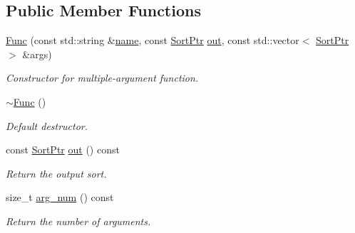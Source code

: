 \subsection*{Public Member Functions}
\begin{DoxyCompactItemize}
\item 
\mbox{\label{classilang_1_1_func_a68120449566b97422d856a045e376d5c}} 
\mbox{\hyperlink{classilang_1_1_func_a68120449566b97422d856a045e376d5c}{Func}} (const std\+::string \&\mbox{\hyperlink{classilang_1_1_object_acf20b072e69f572910d7d80c93af0b38}{name}}, const \mbox{\hyperlink{namespaceilang_ae01073336878d60a231f4fe96d45ab55}{Sort\+Ptr}} \mbox{\hyperlink{classilang_1_1_func_a58414a3455af0484ccfcce8401b02d37}{out}}, const std\+::vector$<$ \mbox{\hyperlink{namespaceilang_ae01073336878d60a231f4fe96d45ab55}{Sort\+Ptr}} $>$ \&args)
\begin{DoxyCompactList}\small\item\em Constructor for multiple-\/argument function. \end{DoxyCompactList}\item 
\mbox{\label{classilang_1_1_func_a069c00d01e70a84fb217191ab5cd45dc}} 
\mbox{\hyperlink{classilang_1_1_func_a069c00d01e70a84fb217191ab5cd45dc}{$\sim$\+Func}} ()
\begin{DoxyCompactList}\small\item\em Default destructor. \end{DoxyCompactList}\item 
\mbox{\label{classilang_1_1_func_a58414a3455af0484ccfcce8401b02d37}} 
const \mbox{\hyperlink{namespaceilang_ae01073336878d60a231f4fe96d45ab55}{Sort\+Ptr}} \mbox{\hyperlink{classilang_1_1_func_a58414a3455af0484ccfcce8401b02d37}{out}} () const
\begin{DoxyCompactList}\small\item\em Return the output sort. \end{DoxyCompactList}\item 
\mbox{\label{classilang_1_1_func_aa4ac51e100f5fd9380ce9d43fe2a3092}} 
size\+\_\+t \mbox{\hyperlink{classilang_1_1_func_aa4ac51e100f5fd9380ce9d43fe2a3092}{arg\+\_\+num}} () const
\begin{DoxyCompactList}\small\item\em Return the number of arguments. \end{DoxyCompactList}\item 

\end{DoxyCompactItemize}
